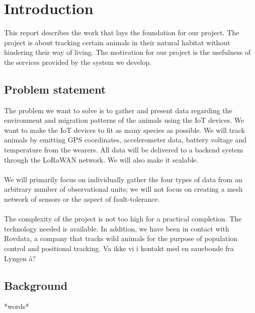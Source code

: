 \tableofcontents
\listoffigures

\clearpage

\section{Introduction}
	This report describes the work that lays the foundation for our project. The project is about tracking certain animals in their natural habitat without hindering their way of living. The motivation for our project is the usefulness of the services provided by the system we develop. 
	\subsection{Problem statement}
		The problem we want to solve is to gather and present data regarding the environment and migration patterns of the animals using the IoT devices. We want to make the IoT devices to fit as many species as possible. We will track animals by emitting GPS coordinates, accelerometer data, battery voltage and temperature from the wearers. All data will be delivered to a backend system through the LoRaWAN network. We will also make it scalable. 
		\\\\
		We will primarily focus on individually gather the four types of data from an arbitrary number of observational units; we will not focus on creating a mesh network of sensors or the aspect of fault-tolerance. 
		\\\\
		The complexity of the project is not too high for a practical completion. The technology needed is available. In addition, we have been in contact with Rovdata, a company that tracks wild animals for the purpose of population control and positional tracking. Va ikke vi i kontakt med en sauebonde fra Lyngen å? 
	\subsection{Background}
		*words*
		
